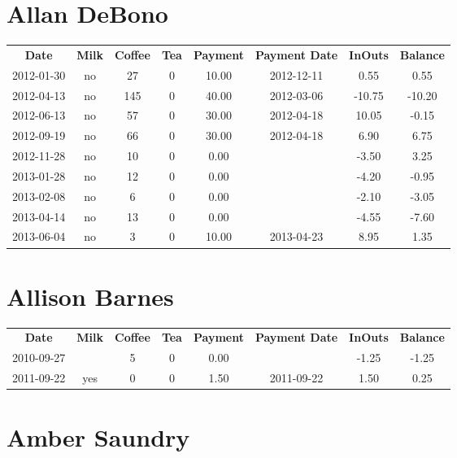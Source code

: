 \section{Allan DeBono}

\begin{center}
\begin{tabular}{cccccccc}
\textbf{Date} & \textbf{Milk} & \textbf{Coffee} & \textbf{Tea} & \textbf{Payment} & \textbf{Payment Date} & \textbf{InOuts} & \textbf{Balance} \\
2012-01-30 & no &  27 & 0 & 10.00 & 2012-12-11 &   0.55 &   0.55\\ 
2012-04-13 & no & 145 & 0 & 40.00 & 2012-03-06 & -10.75 & -10.20\\ 
2012-06-13 & no &  57 & 0 & 30.00 & 2012-04-18 &  10.05 &  -0.15\\ 
2012-09-19 & no &  66 & 0 & 30.00 & 2012-04-18 &   6.90 &   6.75\\ 
2012-11-28 & no &  10 & 0 &  0.00 &  &  -3.50 &   3.25\\ 
2013-01-28 & no &  12 & 0 &  0.00 &  &  -4.20 &  -0.95\\ 
2013-02-08 & no &   6 & 0 &  0.00 &  &  -2.10 &  -3.05\\ 
2013-04-14 & no &  13 & 0 &  0.00 &  &  -4.55 &  -7.60\\ 
2013-06-04 & no &   3 & 0 & 10.00 & 2013-04-23 &   8.95 &   1.35
\end{tabular}
\end{center}

\section{Allison Barnes}

\begin{center}
\begin{tabular}{cccccccc}
\textbf{Date} & \textbf{Milk} & \textbf{Coffee} & \textbf{Tea} & \textbf{Payment} & \textbf{Payment Date} & \textbf{InOuts} & \textbf{Balance} \\
2010-09-27 &  & 5 & 0 & 0.00 &  & -1.25 & -1.25\\ 
2011-09-22 & yes & 0 & 0 & 1.50 & 2011-09-22 &  1.50 &  0.25
\end{tabular}
\end{center}

\section{Amber Saundry}

